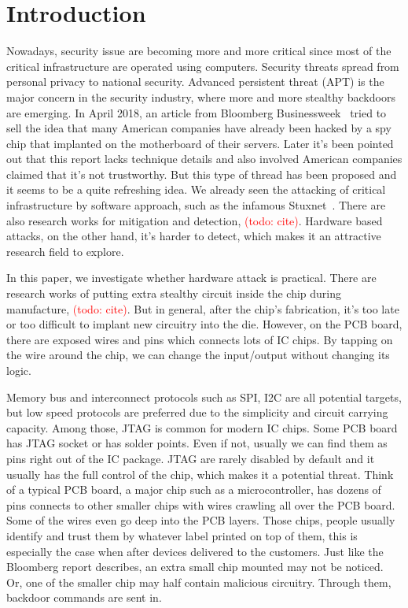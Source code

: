 \section{Introduction}
\label{sec:introduction}
Nowadays, security issue are becoming more and more critical since most of the critical infrastructure are operated using computers. Security threats spread from personal privacy to national security. Advanced persistent threat (APT) is the major concern in the security industry, where more and more stealthy backdoors are emerging. In April 2018, an article from Bloomberg Businessweek~\cite{robertson2018big} tried to sell the idea that many American companies have already been hacked by a spy chip that implanted on the motherboard of their servers. Later it's been pointed out that this report lacks technique details and also involved American companies claimed that it's not trustworthy. But this type of thread has been proposed and it seems to be a quite refreshing idea. We already seen the attacking of critical infrastructure by software approach, such as the infamous Stuxnet~\cite{langner2011stuxnet}. There are also research works for mitigation and detection, \textcolor{red}{(todo: cite)}. Hardware based attacks, on the other hand, it's harder to detect, which makes it an attractive research field to explore. 

In this paper, we investigate whether hardware attack is practical. There are research works of putting extra stealthy circuit inside the chip during manufacture, \textcolor{red}{(todo: cite)}. But in general, after the chip's fabrication, it's too late or too difficult to implant new circuitry into the die. However, on the PCB board, there are exposed wires and pins which connects lots of IC chips. By tapping on the wire around the chip, we can change the input/output without changing its logic.

Memory bus and interconnect protocols such as SPI, I2C are all potential targets, but low speed protocols are preferred due to the simplicity and circuit carrying capacity. Among those, JTAG is common for modern IC chips. Some PCB board has JTAG socket or has solder points. Even if not, usually we can find them as pins right out of the IC package. JTAG are rarely disabled by default and it usually has the full control of the chip, which makes it a potential threat. Think of a typical PCB board, a major chip such as a microcontroller, has dozens of pins connects to other smaller chips with wires crawling all over the PCB board. Some of the wires even go deep into the PCB layers. Those chips, people usually identify and trust them by whatever label printed on top of them, this is especially the case when after devices delivered to the customers. Just like the Bloomberg report describes, an extra small chip mounted may not be noticed. Or, one of the smaller chip may half contain malicious circuitry. Through them, backdoor commands are sent in.

